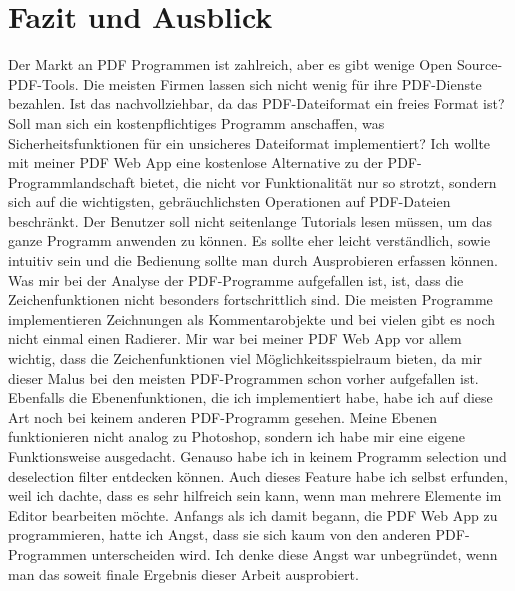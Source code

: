\chapter{Fazit und Ausblick}
Der Markt an PDF Programmen ist zahlreich, aber es gibt wenige Open Source-PDF-Tools. Die meisten Firmen lassen sich nicht wenig für ihre PDF-Dienste bezahlen. Ist das nachvollziehbar, da das PDF-Dateiformat ein freies Format ist? Soll man sich ein kostenpflichtiges Programm anschaffen, was Sicherheitsfunktionen für ein unsicheres Dateiformat implementiert? Ich wollte mit meiner PDF Web App eine kostenlose Alternative zu der PDF-Programmlandschaft bietet, die nicht vor Funktionalität nur so strotzt, sondern sich auf die wichtigsten, gebräuchlichsten Operationen auf PDF-Dateien beschränkt. Der Benutzer soll nicht seitenlange Tutorials lesen müssen, um das ganze Programm anwenden zu können. Es sollte eher leicht verständlich, sowie intuitiv sein und die Bedienung sollte man durch Ausprobieren erfassen können. Was mir bei der Analyse der PDF-Programme aufgefallen ist, ist, dass die Zeichenfunktionen nicht besonders fortschrittlich sind. Die meisten Programme implementieren Zeichnungen als Kommentarobjekte und bei vielen gibt es noch nicht einmal einen Radierer. Mir war bei meiner PDF Web App vor allem wichtig, dass die Zeichenfunktionen viel Möglichkeitsspielraum bieten, da mir dieser Malus bei den meisten PDF-Programmen schon vorher aufgefallen ist. Ebenfalls die Ebenenfunktionen, die ich implementiert habe, habe ich auf diese Art noch bei keinem anderen PDF-Programm gesehen. Meine Ebenen funktionieren nicht analog zu Photoshop, sondern ich habe mir eine eigene Funktionsweise ausgedacht. Genauso habe ich in keinem Programm selection und deselection filter entdecken können. Auch dieses Feature habe ich selbst erfunden, weil ich dachte, dass es sehr hilfreich sein kann, wenn man mehrere Elemente im Editor bearbeiten möchte. Anfangs als ich damit begann, die PDF Web App zu programmieren, hatte ich Angst, dass sie sich kaum von den anderen PDF-Programmen unterscheiden wird. Ich denke diese Angst war unbegründet, wenn man das soweit finale Ergebnis dieser Arbeit ausprobiert.
\par
